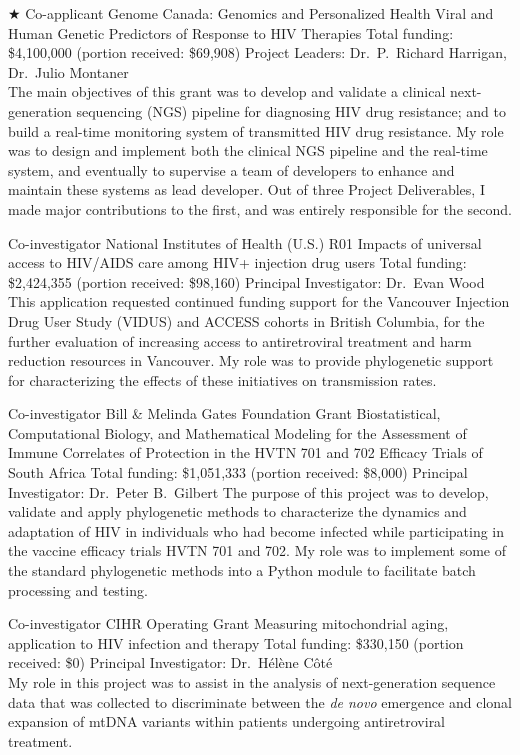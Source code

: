 \documentclass[11pt]{moderncv}
\begin{document}
{$\bigstar$ Co-applicant}
{Genome Canada: Genomics and Personalized Health}
{Viral and Human Genetic Predictors of Response to HIV Therapies}
{Total funding: \$4,100,000 (portion received: \$69,908)}
{
Project Leaders: Dr.~P.~Richard Harrigan, Dr.~Julio Montaner\\
The main objectives of this grant was to develop and validate a clinical next-generation sequencing (NGS) pipeline for diagnosing HIV drug resistance;
and to build a real-time monitoring system of transmitted HIV drug resistance.
My role was to design and implement both the clinical NGS pipeline and the real-time system, and eventually to supervise a team of developers to enhance and maintain these systems as lead developer.
Out of three Project Deliverables, I made major contributions to the first, and was entirely responsible for the second.\\
}


{Co-investigator}
{National Institutes of Health (U.S.) R01}
{Impacts of universal access to HIV/AIDS care among HIV+ injection drug users}
{Total funding: \$2,424,355 (portion received: \$98,160)}
{
Principal Investigator: Dr.~Evan Wood\\
This application requested continued funding support for the Vancouver Injection Drug User Study (VIDUS) and ACCESS cohorts in British Columbia, for the further evaluation of increasing access to antiretroviral treatment and harm reduction resources in Vancouver.
My role was to provide phylogenetic support for characterizing the effects of these initiatives on transmission rates.\\
}


{Co-investigator}
{Bill \& Melinda Gates Foundation Grant}
{Biostatistical, Computational Biology, and Mathematical Modeling for the Assessment of
Immune Correlates of Protection in the HVTN 701 and 702 Efficacy Trials of South Africa}
{Total funding: \$1,051,333 (portion received: \$8,000)}
{
Principal Investigator: Dr.~Peter B.~Gilbert
The purpose of this project was to develop, validate and apply phylogenetic methods to characterize the dynamics and adaptation of HIV in individuals who had become infected while participating in the vaccine efficacy trials HVTN 701 and 702.
My role was to implement some of the standard phylogenetic methods into a Python module to facilitate batch processing and testing.\\
}


{Co-investigator}
{CIHR Operating Grant}
{Measuring mitochondrial aging, application to HIV infection and therapy}
{Total funding: \$330,150 (portion received: \$0)}
{
Principal Investigator: Dr.~H\'el\`ene C\^ot\'e\\
My role in this project was to assist in the analysis of next-generation sequence data that was collected to discriminate between the \textit{de novo} emergence and clonal expansion of mtDNA variants within patients undergoing antiretroviral treatment.\\
}
\end{document}
